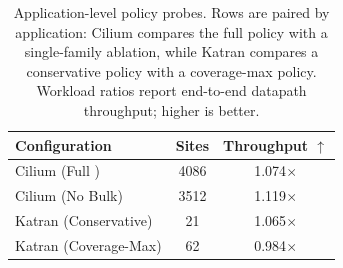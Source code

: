 \begin{table}[t]
\centering
\caption{Application-level \lang{} policy probes. Rows are paired by
application: Cilium compares the full policy with a single-family ablation,
while Katran compares a conservative policy with a coverage-max policy.
Workload ratios report end-to-end datapath throughput; higher is better.}
\label{tab:app_case_studies}
\small
\begin{tabular}{lcc}
\toprule
Configuration & Sites & Throughput $\uparrow$ \\
\midrule
Cilium (Full \lang{}) &
4086 &
1.074$\times$ \\

Cilium (No Bulk) &
3512 &
1.119$\times$ \\

Katran (Conservative) &
21 &
1.065$\times$ \\

Katran (Coverage-Max) &
62 &
0.984$\times$ \\
\bottomrule
\end{tabular}
\end{table}